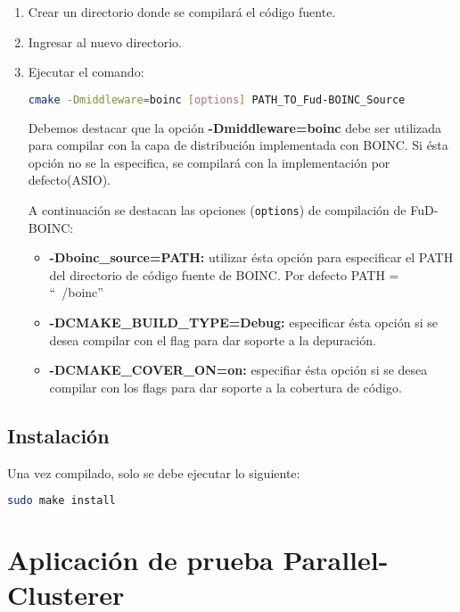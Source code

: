\documentclass[12pt,spanish,a4paper]{report}
\begin{document}
\begin{enumerate}
\item Crear un directorio donde se compilará el código fuente.
\item Ingresar al nuevo directorio.
\item Ejecutar el comando:

\begin{lstlisting}[frame=shadowbox, language=bash, basicstyle=\footnotesize, backgroundcolor=\color{gris}]
cmake -Dmiddleware=boinc [options] PATH_TO_Fud-BOINC_Source 
\end{lstlisting}

Debemos destacar que la opción \textbf{-Dmiddleware=boinc} debe ser utilizada para compilar con la capa de distribución implementada con BOINC. Si ésta opción no se la especifica, se compilará con la implementación por defecto(ASIO).

A continuación se destacan las opciones (\texttt{options}) de compilación de FuD-BOINC:

\begin{itemize}
 \item \textbf{-Dboinc\_source=PATH:} utilizar ésta opción para especificar el PATH del directorio de código fuente de BOINC. Por defecto PATH = ``~/boinc''
 \item \textbf{-DCMAKE\_BUILD\_TYPE=Debug:} especificar ésta opción si se desea compilar con el flag para dar soporte a la depuración.
 \item \textbf{-DCMAKE\_COVER\_ON=on:} especifiar ésta opción si se desea compilar con los flags para dar soporte a la cobertura de código.
\end{itemize}
\end{enumerate}


\section{Instalación}

Una vez compilado, solo se debe ejecutar lo siguiente:

\begin{lstlisting}[frame=shadowbox, language=bash, basicstyle=\footnotesize, backgroundcolor=\color{gris}]
sudo make install
\end{lstlisting}


\chapter{Aplicación de prueba Parallel-Clusterer}
\end{document}
